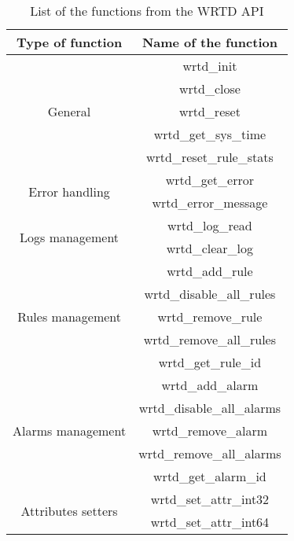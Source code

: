 \begin{table}
\centering
\caption{List of the functions from the WRTD API}
\begin{tabular}{cc}
Type of function & Name of the function \\
\hline
\hline
\multirow{5}{*}{General} 
& wrtd\_init \\                                                                
& wrtd\_close \\                                                                  
& wrtd\_reset \\ 
& wrtd\_get\_sys\_time \\                                                      
& wrtd\_reset\_rule\_stats \\   
\hline
\multirow{2}{*}{Error handling} 
& wrtd\_get\_error \\                                                             
& wrtd\_error\_message \\  
\hline
\multirow{2}{*}{Logs management} 
& wrtd\_log\_read \\                                                           
& wrtd\_clear\_log \\ 
\hline
\multirow{5}{*}{Rules management} 
& wrtd\_add\_rule \\                                                           
& wrtd\_disable\_all\_rules \\                                                    
& wrtd\_remove\_rule \\                                                           
& wrtd\_remove\_all\_rules \\                                                     
& wrtd\_get\_rule\_id \\  
\hline
\multirow{5}{*}{Alarms management} 
& wrtd\_add\_alarm \\                                                          
& wrtd\_disable\_all\_alarms \\                                                
& wrtd\_remove\_alarm \\                                                       
& wrtd\_remove\_all\_alarms \\                                                 
& wrtd\_get\_alarm\_id \\ 
\hline
\multirow{5}{*}{Attributes setters} 
& wrtd\_set\_attr\_int32 \\                                                    
& wrtd\_set\_attr\_int64 \\                                                    

\end{tabular}
\end{table}
